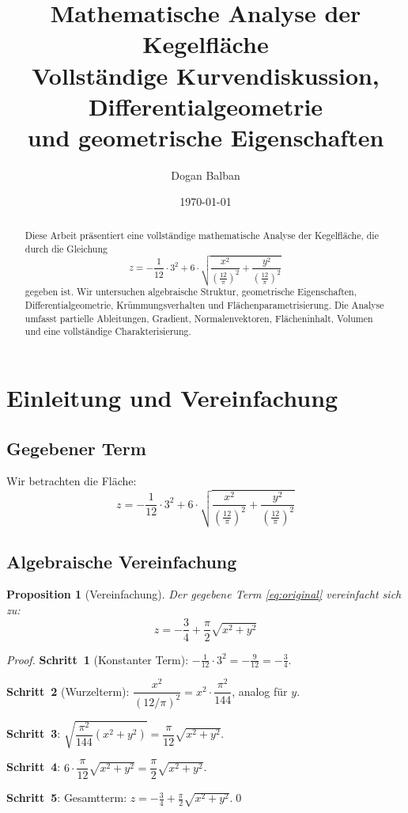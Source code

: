 \documentclass[12pt,a4paper]{article}
\title{\textbf{Mathematische Analyse der Kegelfl\"{a}che}\\[0.5em]
\large Vollst\"{a}ndige Kurvendiskussion, Differentialgeometrie\\
und geometrische Eigenschaften}
\author{Dogan Balban}
\date{\today}
\theoremstyle{plain}
\newtheorem{proposition}[satz]{Proposition}
\theoremstyle{definition}
\theoremstyle{remark}
\begin{document}
\maketitle

\begin{abstract}
Diese Arbeit pr\"{a}sentiert eine vollst\"{a}ndige mathematische Analyse der Kegelfl\"{a}che,
die durch die Gleichung
\[
z = -\frac{1}{12}\cdot 3^{2} + 6\cdot\sqrt{\frac{x^{2}}{\left(\frac{12}{\pi}\right)^{2}}
+\frac{y^{2}}{\left(\frac{12}{\pi}\right)^{2}}}
\]
gegeben ist. Wir untersuchen algebraische Struktur, geometrische Eigenschaften,
Differentialgeometrie, Kr\"{u}mmungsverhalten und Fl\"{a}chenparametrisierung.
Die Analyse umfasst partielle Ableitungen, Gradient, Normalenvektoren,
Fl\"{a}cheninhalt, Volumen und eine vollst\"{a}ndige Charakterisierung.
\end{abstract}

\tableofcontents
\newpage

\section{Einleitung und Vereinfachung}

\subsection{Gegebener Term}

Wir betrachten die Fl\"{a}che:
\begin{equation}\label{eq:original}
z = -\frac{1}{12}\cdot 3^{2} + 6\cdot\sqrt{\frac{x^{2}}{\left(\frac{12}{\pi}\right)^{2}}
+\frac{y^{2}}{\left(\frac{12}{\pi}\right)^{2}}}
\end{equation}

\subsection{Algebraische Vereinfachung}

\begin{proposition}[Vereinfachung]\label{prop:vereinfachung}
Der gegebene Term \eqref{eq:original} vereinfacht sich zu:
\begin{equation}\label{eq:simplified}
z = -\frac{3}{4} + \frac{\pi}{2}\sqrt{x^2 + y^2}
\end{equation}
\end{proposition}

\begin{proof}
\textbf{Schritt~1} (Konstanter Term):
$-\tfrac{1}{12}\cdot 3^{2} = -\tfrac{9}{12} = -\tfrac{3}{4}$.

\textbf{Schritt~2} (Wurzelterm):
$\dfrac{x^{2}}{(12/\pi)^{2}} = x^{2}\cdot\dfrac{\pi^2}{144}$, analog f\"{u}r $y$.

\textbf{Schritt~3}:
$\sqrt{\dfrac{\pi^2}{144}(x^2+y^2)} = \dfrac{\pi}{12}\sqrt{x^2+y^2}$.

\textbf{Schritt~4}:
$6\cdot\dfrac{\pi}{12}\sqrt{x^2+y^2} = \dfrac{\pi}{2}\sqrt{x^2+y^2}$.

\textbf{Schritt~5}: Gesamtterm: $z = -\tfrac{3}{4}+\tfrac{\pi}{2}\sqrt{x^2+y^2}$.\qed
\end{proof}
\end{document}
